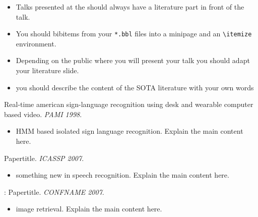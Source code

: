 \documentclass[11pt, a4paper, landscape]{article}
\begin{document}
\NewPage{} 
\vfill
\begin{itemize}
\item Talks presented at the
  \href{http://www-i6.rwth-aachen.de/}{\isechsicon}
  should always have a literature part in front of the talk. 
\item You should  bibitems from your \texttt{*.bbl} files
  into a minipage and an \texttt{\textbackslash itemize} environment.
\item Depending on the public where you will present your talk you should adapt
  your literature slide.
\item you should describe the content of the SOTA literature with your
  own words
\end{itemize}
\vfill 

\NewPage{} 
\vfill 
\begin{description}
\item [T.~Starner, J.~Weaver, A.~Pentland:] Real-time american sign-language
  recognition using desk and wearable computer based video. {\em PAMI 1998}.
  \begin{itemize}
  \item HMM based isolated sign language recognition. Explain the main content here.
  \end{itemize}
\item [Povey:] Papertitle. {\em ICASSP 2007}.
  \begin{itemize}
  \item something new in speech recognition. Explain the main content here.
  \end{itemize}
\item \cite{loupias:_wavel_salien_point_image_retriev}: Papertitle. {\em CONFNAME 2007}.
  \begin{itemize}
  \item image retrieval. Explain the main content here.
  \end{itemize}
\end{description}
\vfill
\end{document}
